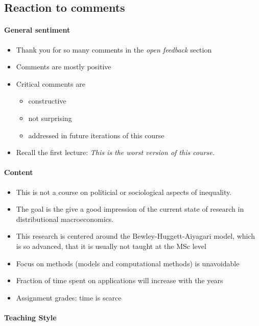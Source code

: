 \documentclass[a4paper,12pt]{article}
\begin{document}
\subsection*{Reaction to comments}

\paragraph{General sentiment}

\begin{itemize}
  \item Thank you for so many comments in the \emph{open feedback} section
  \item Comments are mostly positive
  \item Critical comments are 
  \begin{itemize}
    \item constructive
    \item not surprising
    \item addressed in future iterations of this course
  \end{itemize}
  \item Recall the first lecture: \emph{This is the worst version of this course.} 
\end{itemize}

\paragraph{Content}

\begin{itemize}
  \item This is not a course on politicial or sociological aspects of inequality.
  \item The goal is the give a good impression of the current state of research in distributional macroeconomics.
  \item This research is centered around the Bewley-Huggett-Aiyagari model, which is so advanced, that it is usually not taught at the MSc level
  \item Focus on methods (models and computational methods) is unavoidable
  \item Fraction of time spent on applications will increase with the years
  \item Assignment grades: time is scarce
\end{itemize}

\paragraph{Teaching Style}
\end{document}
